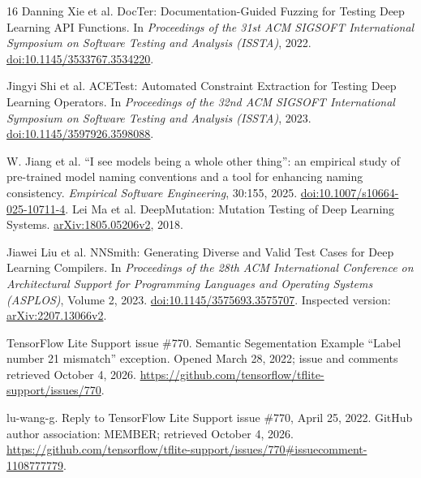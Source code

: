 \documentclass[10pt,conference]{IEEEtran}
\begin{document}
\begin{thebibliography}{16}
 Danning Xie et al. DocTer: Documentation-Guided Fuzzing for Testing Deep Learning API Functions. In \emph{Proceedings of the 31st ACM SIGSOFT International Symposium on Software Testing and Analysis (ISSTA)}, 2022. \href{https://doi.org/10.1145/3533767.3534220}{doi:10.1145/3533767.3534220}.

 Jingyi Shi et al. ACETest: Automated Constraint Extraction for Testing Deep Learning Operators. In \emph{Proceedings of the 32nd ACM SIGSOFT International Symposium on Software Testing and Analysis (ISSTA)}, 2023. \href{https://doi.org/10.1145/3597926.3598088}{doi:10.1145/3597926.3598088}.

 W. Jiang et al. ``I see models being a whole other thing'': an empirical study of pre-trained model naming conventions and a tool for enhancing naming consistency. \emph{Empirical Software Engineering}, 30:155, 2025. \href{https://doi.org/10.1007/s10664-025-10711-4}{doi:10.1007/s10664-025-10711-4}.
 Lei Ma et al.
DeepMutation: Mutation Testing of Deep Learning Systems.
\href{https://arxiv.org/abs/1805.05206v2}{arXiv:1805.05206v2}, 2018.

 Jiawei Liu et al.
NNSmith: Generating Diverse and Valid Test Cases for Deep Learning Compilers.
In \emph{Proceedings of the 28th ACM International Conference on Architectural
Support for Programming Languages and Operating Systems (ASPLOS)}, Volume 2,
2023.
\href{https://doi.org/10.1145/3575693.3575707}{doi:10.1145/3575693.3575707}.
Inspected version: \href{https://arxiv.org/abs/2207.13066v2}{arXiv:2207.13066v2}.

 TensorFlow Lite Support issue \#770.
Semantic Segementation Example ``Label number 21 mismatch'' exception.
Opened March 28, 2022; issue and comments retrieved October 4, 2026.
\url{https://github.com/tensorflow/tflite-support/issues/770}.

 lu-wang-g.
Reply to TensorFlow Lite Support issue \#770, April 25, 2022.
GitHub author association: MEMBER; retrieved October 4, 2026.
\url{https://github.com/tensorflow/tflite-support/issues/770#issuecomment-1108777779}.
\end{thebibliography}
\end{document}
